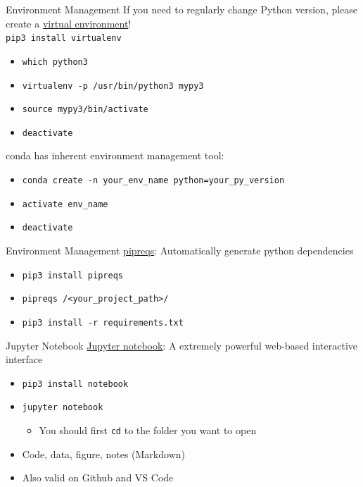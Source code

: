 \documentclass{../TexTemplate/myslide}
\begin{document}
\begin{frame}[fragile]{Environment Management}
If you need to regularly change Python version, please create a \href{https://virtualenv.pypa.io/en/latest/}{virtual environment}!\\
\verb'pip3 install virtualenv'
\begin{itemize}
	\item \verb'which python3'
	\item \verb'virtualenv -p /usr/bin/python3 mypy3'
	\item \verb'source mypy3/bin/activate'
	\item \verb'deactivate'
\end{itemize}
conda has inherent environment management tool:
\begin{itemize}
	\item \verb'conda create -n your_env_name python=your_py_version'
	\item \verb'activate env_name'
	\item \verb'deactivate'
\end{itemize}
\end{frame}

\begin{frame}[fragile]{Environment Management}
\href{https://dev.to/bhupesh/pipreqs-automatically-generate-python-dependencies-30nl}{pipreqs}: Automatically generate python dependencies
\begin{itemize}
	\item \verb'pip3 install pipreqs'
	\item \verb'pipreqs /<your_project_path>/'
	\item \verb'pip3 install -r requirements.txt'
\end{itemize}
\end{frame}

\begin{frame}[fragile]{Jupyter Notebook}
\href{https://jupyter.org/}{Jupyter notebook}: A extremely powerful web-based interactive interface
\begin{itemize}
	\item \verb'pip3 install notebook'
	\item \verb'jupyter notebook'
	\begin{itemize}
		\item You should first \verb'cd' to the folder you want to open
	\end{itemize}
	\item Code, data, figure, notes (Markdown)
	\item Also valid on Github and VS Code
\end{itemize}
\end{frame}
\end{document}
